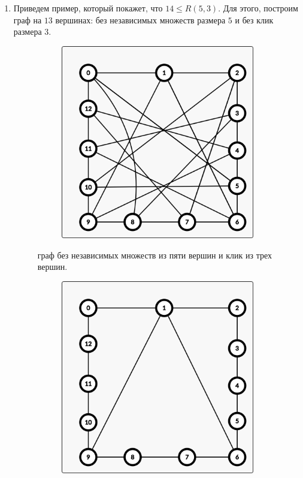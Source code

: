 \begin{solution}
\begin{enumerate}
\item Приведем пример, который покажет, что $14 \leq R(5, 3)$.
Для этого, построим граф на $13$ вершинах: без независимых множеств размера $5$ и без клик размера $3$.
\begin{figure}[H]
  \centering
  \begin{subfigure}[a]{0.24\linewidth}
    \includegraphics[width=\linewidth]{_img/202/01.png}
  \end{subfigure}
  \caption{граф без независимых множеств из пяти вершин и клик из трех вершин.}
\end{figure}
\begin{figure}[H]
  \centering
  \begin{subfigure}[a]{0.24\linewidth}
    \includegraphics[width=\linewidth]{_img/202/02.png}

\end{subfigure}
\end{figure}
\end{enumerate}
\end{solution}
